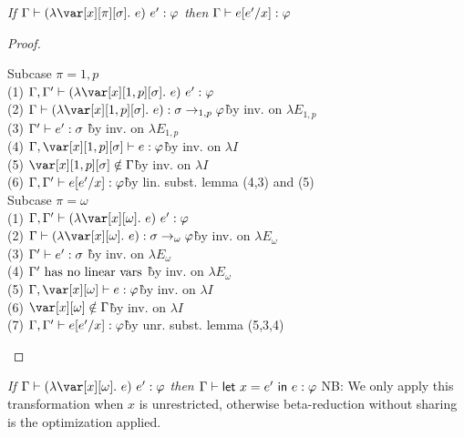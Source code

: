 \begin{lemma}
    \emph{If $\G \vdash (\lambda \x[\pi][\s].~e)~e' : \vp$ then $\Gamma \vdash e[e'/x] : \varphi$}
\end{lemma}

\begin{proof}~

\begin{tabbing}
    Subcase $\pi = 1,p$\\
    (1) $\G,\G' \vdash (\lambda \x[1,p][\s].~e)~e' : \vp$\\
    (2) $\G \vdash (\lambda \x[1,p][\s].~e) : \s \to_{1,p} \vp$\` by inv. on $\lambda E_{1,p}$\\
    (3) $\Gamma' \vdash e' : \sigma$ \` by inv. on $\lambda E_{1,p}$\\
    (4) $\G,\x[1,p][\s] \vdash e : \vp $\`by inv. on $\lambda I$\\
    (5) $\x[1,p][\s] \notin \G$\`by inv. on $\lambda I$\\
    (6) $\Gamma,\Gamma' \vdash e[e'/x] : \varphi$\` by lin. subst. lemma (4,3) and (5)\\
    Subcase $\pi = \omega$\\
    (1) $\G,\G' \vdash (\lambda \xo.~e)~e' : \vp$\\
    (2) $\G \vdash (\lambda \xo.~e) : \s \to_\omega \vp$\` by inv. on $\lambda E_\omega$\\
    (3) $\Gamma' \vdash e' : \sigma$ \` by inv. on $\lambda E_\omega$\\
    (4) $\Gamma' ~\textrm{has no linear vars}$ \` by inv. on $\lambda E_\omega$\\
    (5) $\G,\xo \vdash e : \vp$\` by inv. on $\lambda I$\\
    (6) $\xo \notin \G$\` by inv. on $\lambda I$\\
    (7) $\Gamma,\Gamma' \vdash e[e'/x] : \varphi$\` by unr. subst. lemma (5,3,4)\\
\end{tabbing}
\end{proof}

\begin{lemma}
    \emph{If $\G \vdash (\lambda \xo.~e)~e' : \vp$ then $\Gamma \vdash \mathsf{let}~x = e'~\mathsf{in}~e : \varphi$}
    NB: We only apply this transformation when $x$ is unrestricted, otherwise beta-reduction without sharing is the optimization applied.
\end{lemma}

